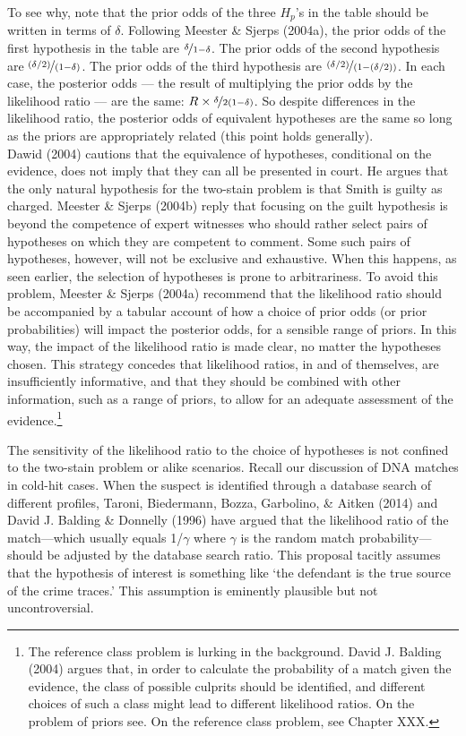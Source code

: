 \documentclass[
  10pt,
  dvipsnames,enabledeprecatedfontcommands]{scrartcl}
\begin{document}
To see why, note that the prior odds of the three \(H_p\)'s in the table
should be written in terms of \(\delta\). Following Meester \& Sjerps
(2004a), the prior odds of the first hypothesis in the table are
\(\nicefrac{\delta}{1-\delta}\). The prior odds of the second hypothesis
are \(\nicefrac{(\delta/2)}{(1-\delta)}\). The prior odds of the third
hypothesis are \(\nicefrac{(\delta/2)}{(1-(\delta/2))}\). In each case,
the posterior odds --- the result of multiplying the prior odds by the
likelihood ratio --- are the same:
\(R\times \nicefrac{\delta}{2(1-\delta)}\). So despite differences in
the likelihood ratio, the posterior odds of equivalent hypotheses are
the same so long as the priors are appropriately related (this point
holds generally).\\
Dawid (2004) cautions that the equivalence of hypotheses, conditional on
the evidence, does not imply that they can all be presented in court. He
argues that the only natural hypothesis for the two-stain problem is
that Smith is guilty as charged. Meester \& Sjerps (2004b) reply that
focusing on the guilt hypothesis is beyond the competence of expert
witnesses who should rather select pairs of hypotheses on which they are
competent to comment. Some such pairs of hypotheses, however, will not
be exclusive and exhaustive. When this happens, as seen earlier, the
selection of hypotheses is prone to arbitrariness. To avoid this
problem, Meester \& Sjerps (2004a) recommend that the likelihood ratio
should be accompanied by a tabular account of how a choice of prior odds
(or prior probabilities) will impact the posterior odds, for a sensible
range of priors. In this way, the impact of the likelihood ratio is made
clear, no matter the hypotheses chosen. This strategy concedes that
likelihood ratios, in and of themselves, are insufficiently informative,
and that they should be combined with other information, such as a range
of priors, to allow for an adequate assessment of the
evidence.\footnote{The reference class problem is lurking in the
  background. David J. Balding (2004) argues that, in order to calculate
  the probability of a match given the evidence, the class of possible
  culprits should be identified, and different choices of such a class
  might lead to different likelihood ratios. On the problem of priors
  see. On the reference class problem, see Chapter XXX.}

The sensitivity of the likelihood ratio to the choice of hypotheses is
not confined to the two-stain problem or alike scenarios. Recall our
discussion of DNA matches in cold-hit cases. When the suspect is
identified through a database search of different profiles, Taroni,
Biedermann, Bozza, Garbolino, \& Aitken (2014) and David J. Balding \&
Donnelly (1996) have argued that the likelihood ratio of the
match---which usually equals 1/\(\gamma\) where \(\gamma\) is the random
match probability---should be adjusted by the database search ratio.
This proposal tacitly assumes that the hypothesis of interest is
something like `the defendant is the true source of the crime traces.'
This assumption is eminently plausible but not uncontroversial.
\end{document}
